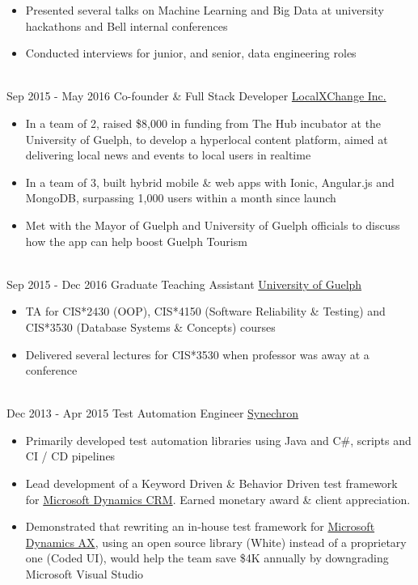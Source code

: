 \documentclass[letterpaper]{twentysecondcv} %
\begin{document}
\begin{twenty}
{\begin{itemize}
        Awards: Merit Gold (2x), Merit Platinum
        \item Presented several talks on Machine Learning and Big Data at university hackathons and Bell internal conferences
        \item Conducted interviews for junior, and senior, data engineering roles
        \end{itemize}}
        \\
	\twentyitem
    	{Sep 2015 -}
		{May 2016}
        {Co-founder \& Full Stack Developer}
        {\href{http://www.localxchange.ca/}{LocalXChange Inc.}}
        {}
        {
        {\begin{itemize}
        \item In a team of 2, raised \$8,000 in funding from The Hub incubator at the University of Guelph, to develop a hyperlocal content platform, aimed at delivering local news and events to local users in realtime
        \item In a team of 3, built hybrid mobile \& web apps with Ionic, Angular.js and MongoDB, surpassing 1,000 users within a month since launch
        \item Met with the Mayor of Guelph and University of Guelph officials to discuss how the app can help boost Guelph Tourism 
    \end{itemize}}
        }
    \\   
    \twentyitem
   		{Sep 2015 -}
		{Dec 2016}
        {Graduate Teaching Assistant}
        {\href{http://www.uoguelph.ca}{University of Guelph}}
        {}
        {
        {\begin{itemize}
        \item TA for CIS*2430 (OOP), CIS*4150 (Software Reliability \& Testing) and CIS*3530 (Database Systems \& Concepts) courses
        \item Delivered several lectures for CIS*3530 when professor was away at a conference
    \end{itemize}}
        }
     \\
     \twentyitem
   		{Dec 2013 -}
		{Apr 2015}
        {Test Automation Engineer}
        {\href{http://www.synechron.com/}{Synechron}}
        {}
        {
        \begin{itemize}
        \item Primarily developed test automation libraries using Java and C\#, scripts and CI / CD pipelines
        \item Lead development of a Keyword Driven \& Behavior Driven test framework for \href{https://www.microsoft.com/en-ca/dynamics/crm.aspx}{Microsoft Dynamics CRM}. Earned monetary award \& client appreciation.
        \item Demonstrated that rewriting an in-house test framework for \href{https://www.microsoft.com/en-ca/dynamics/erp-ax-overview.aspx}{Microsoft Dynamics AX}, using an open source library (White) instead of a proprietary one (Coded UI), would help the team save \$4K annually by downgrading Microsoft Visual Studio
    \end{itemize}
    	}
        
\end{twenty}
\end{document}

